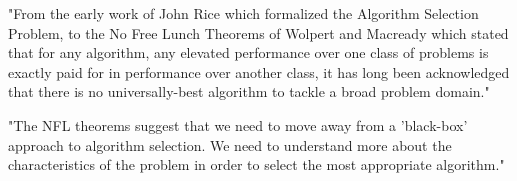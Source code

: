 "From the early work of John Rice which formalized the Algorithm Selection Problem, to the No Free Lunch Theorems of Wolpert and Macready which stated that for any algorithm, any elevated performance over one class of problems is exactly paid for in performance over another class, it has long been acknowledged that there is no universally-best algorithm to tackle a broad problem domain."

"The NFL theorems suggest that we need to move away from a 'black-box' approach to algorithm selection. We need to understand more about the characteristics of the problem in order to select the most appropriate algorithm."
